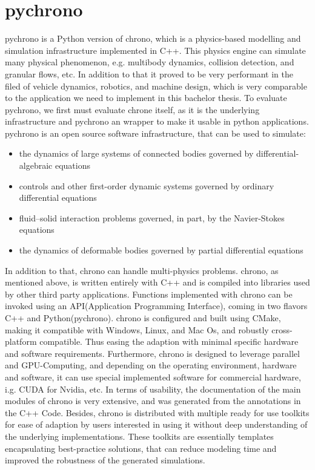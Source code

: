 \documentclass[
	12pt, 
	a4paper, 
]{article}
\begin{document}
	\section{pychrono}
	pychrono is a Python version of chrono, which is a physics-based modelling and simulation infrastructure implemented in C++. This physics engine can simulate many physical phenomenon, e.g. multibody dynamics, collision detection, and granular flows, etc. In addition to that it proved to be very performant in the filed of vehicle dynamics, robotics, and machine design,\cite{tasora2020chrono} which is very comparable to the application we need to implement in this bachelor thesis. To evaluate pychrono, we first must evaluate chrone itself, as it is the underlying infrastructure and pychrono an wrapper to make it usable in python applications.\newline
	pychrono is an open source software infrastructure, that can be used to simulate\cite{tasora2020chrono}:
	\begin{itemize}
		\item the dynamics of large systems of connected bodies governed by differential-algebraic equations
		\item controls and other first-order dynamic systems governed by ordinary differential equations
		\item fluid–solid interaction problems governed, in part, by the Navier-Stokes equations
		\item the dynamics of deformable bodies governed by partial differential equations
	\end{itemize}
	In addition to that, chrono can handle multi-physics problems. chrono, as mentioned above, is written entirely with C++ and is compiled into libraries used by other third party applications. Functions implemented with chrono can be invoked using an API(Application Programming Interface), coming in two flavors C++ and Python(pychrono). chrono is configured and built using CMake, making it compatible with Windows, Linux, and Mac Os, and robustly cross-platform compatible. Thus easing the adaption with minimal specific hardware and software requirements. Furthermore, chrono is designed to leverage parallel and GPU-Computing, and depending on the operating environment, hardware and software, it can use special implemented software for commercial hardware, i.g. CUDA for Nvidia, etc. In terms of usability, the documentation of the main modules of chrono is very extensive, and was generated from the annotations in the C++ Code. Besides, chrono is distributed with multiple ready for use toolkits for ease of adaption by users interested in using it without deep understanding of the underlying implementations. These toolkits are essentially templates encapsulating best-practice solutions, that can reduce modeling time and improved the robustness of the generated simulations\cite{tasora2020chrono}.
\end{document}
